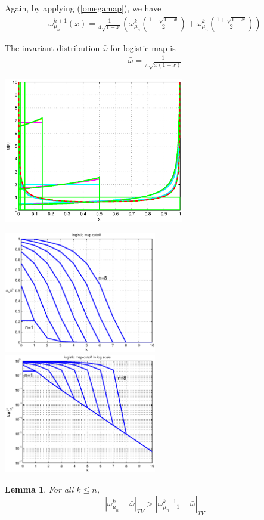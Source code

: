 \documentclass[dvips,landscape]{foils}
\newtheorem{lemma}{Lemma}
\begin{document}
Again, by applying (\ref{omegamap}), we have
 \begin{eqnarray}
 \label{logisticmapevolve}
    \omega_{\mu_n}^{k+1}(x) = \frac{1}{4\sqrt{1-x}}\left( \omega_{\mu_n}^{k}\left( \frac{1-\sqrt{1-x}}{2}\right)
                                            +\omega_{\mu_n}^{k}\left( \frac{1+\sqrt{1-x}}{2}\right) \right)
 \end{eqnarray}
\newpage

The invariant distribution $\bar{\omega}$ for logistic map is 
\begin{eqnarray} 
\label{logisticmapinvariant}
 \bar{\omega} = \frac{1}{\pi\sqrt{x(1-x)}}
\end{eqnarray}

\centerline{
\includegraphics[width=0.59\textwidth,trim=1cm 1cm 0cm 0cm]{logisticmapsimu.eps}
}
\newpage

\centerline{
\includegraphics[width=0.50\textwidth,trim=0cm 0cm 0cm 0cm]{logisticmapcutoff.eps}
\includegraphics[width=0.50\textwidth,trim=0cm 0cm 0cm 0cm]{logisticmapcutofflog.eps}
}
\begin{lemma} For all $k \le n$,
$$|\omega_{\mu_n}^k - \bar{\omega}|_{TV}>|\omega_{\mu_n-1}^{k-1} - \bar{\omega}|_{TV}$$
\end{lemma}
\end{document}
